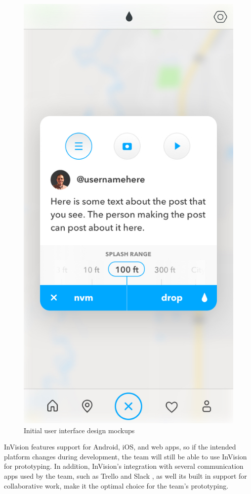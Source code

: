 \documentclass[draftclsnofoot, onecolumn, letterpaper,10pt,compsoc]{IEEEtran}
\begin{document}
\begin{figure}[H]
    \includegraphics[scale=.25]{new_droplet.jpg}
    \caption{Initial user interface design mockups}
    \label{fig:my_label}
\end{figure}
InVision features support for Android, iOS, and web apps, so if the intended platform changes during development, the team will still be able to use InVision for prototyping. In addition, InVision's integration with several communication apps used by the team, such as Trello \cite{trelloIV} and Slack \cite{slackIV}, as well its built in support for collaborative work, make it the optimal choice for the team's prototyping. 
\end{document}
